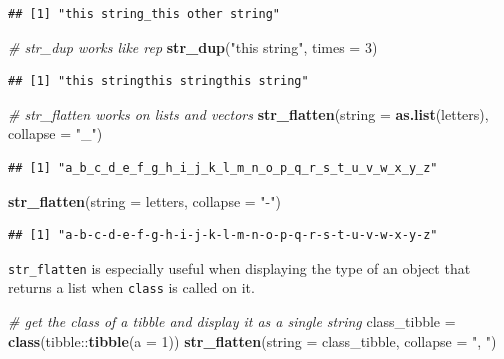 \documentclass[]{book}
\newenvironment{Shaded}{}{}
\newcommand{\CommentTok}[1]{\textcolor[rgb]{0.38,0.63,0.69}{\textit{#1}}}
\newcommand{\DataTypeTok}[1]{\textcolor[rgb]{0.56,0.13,0.00}{#1}}
\newcommand{\DecValTok}[1]{\textcolor[rgb]{0.25,0.63,0.44}{#1}}
\newcommand{\KeywordTok}[1]{\textcolor[rgb]{0.00,0.44,0.13}{\textbf{#1}}}
\newcommand{\NormalTok}[1]{#1}
\newcommand{\OperatorTok}[1]{\textcolor[rgb]{0.40,0.40,0.40}{#1}}
\newcommand{\StringTok}[1]{\textcolor[rgb]{0.25,0.44,0.63}{#1}}
\begin{document}
\begin{verbatim}
## [1] "this string_this other string"
\end{verbatim}

\begin{Shaded}
\begin{Highlighting}[]
\CommentTok{# str_dup works like rep}
\KeywordTok{str_dup}\NormalTok{(}\StringTok{"this string"}\NormalTok{, }\DataTypeTok{times =} \DecValTok{3}\NormalTok{)}
\end{Highlighting}
\end{Shaded}

\begin{verbatim}
## [1] "this stringthis stringthis string"
\end{verbatim}

\begin{Shaded}
\begin{Highlighting}[]
\CommentTok{# str_flatten works on lists and vectors}
\KeywordTok{str_flatten}\NormalTok{(}\DataTypeTok{string =} \KeywordTok{as.list}\NormalTok{(letters), }\DataTypeTok{collapse =} \StringTok{"_"}\NormalTok{)}
\end{Highlighting}
\end{Shaded}

\begin{verbatim}
## [1] "a_b_c_d_e_f_g_h_i_j_k_l_m_n_o_p_q_r_s_t_u_v_w_x_y_z"
\end{verbatim}

\begin{Shaded}
\begin{Highlighting}[]
\KeywordTok{str_flatten}\NormalTok{(}\DataTypeTok{string =}\NormalTok{ letters, }\DataTypeTok{collapse =} \StringTok{"-"}\NormalTok{)}
\end{Highlighting}
\end{Shaded}

\begin{verbatim}
## [1] "a-b-c-d-e-f-g-h-i-j-k-l-m-n-o-p-q-r-s-t-u-v-w-x-y-z"
\end{verbatim}

\texttt{str\_flatten} is especially useful when displaying the type of an object that returns a list when \texttt{class} is called on it.

\begin{Shaded}
\begin{Highlighting}[]
\CommentTok{# get the class of a tibble and display it as a single string}
\NormalTok{class_tibble =}\StringTok{ }\KeywordTok{class}\NormalTok{(tibble}\OperatorTok{::}\KeywordTok{tibble}\NormalTok{(}\DataTypeTok{a =} \DecValTok{1}\NormalTok{))}
\KeywordTok{str_flatten}\NormalTok{(}\DataTypeTok{string =}\NormalTok{ class_tibble, }\DataTypeTok{collapse =} \StringTok{", "}\NormalTok{)}
\end{Highlighting}
\end{Shaded}
\end{document}
